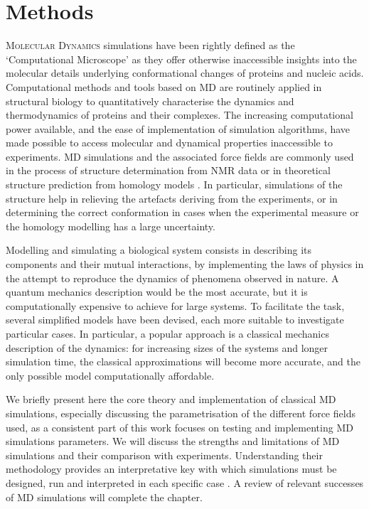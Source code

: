 \chapter{Methods} \label{chapter:MD}

\lettrine{M}{olecular Dynamics} simulations have been rightly defined as the `Computational Microscope' \citep{Lee2009,Dror2012} as they offer otherwise inaccessible insights into the molecular details underlying conformational changes of proteins and nucleic acids. Computational methods and tools based on MD are routinely applied in structural biology to quantitatively characterise the dynamics and thermodynamics of proteins and their complexes. The increasing computational power available, and the ease of implementation of simulation algorithms, have made possible to access molecular and dynamical properties inaccessible to experiments. MD simulations and the associated force fields are commonly used in the process of structure determination from NMR data or in theoretical structure prediction from homology models \citep{Vogel2017,Heo2018}. In particular, simulations of the structure help in relieving the artefacts deriving from the experiments, or in determining the correct conformation in cases when the experimental measure or the homology modelling has a large uncertainty.

Modelling and simulating a biological system consists in describing its components and their mutual interactions, by implementing the laws of physics in the attempt to reproduce the dynamics of phenomena observed in nature. A quantum mechanics description would be the most accurate, but it is computationally expensive to achieve for large systems. To facilitate the task, several simplified models have been devised, each more suitable to investigate particular cases.
%
In particular, a popular approach is a classical mechanics description of the dynamics: for increasing sizes of the systems and longer simulation time, the classical approximations will become more accurate, and the only possible model computationally affordable.

We briefly present here the core theory and implementation of classical MD simulations, especially discussing the parametrisation of the different force fields used, as a consistent part of this work focuses on testing and implementing MD simulations parameters. We will discuss the strengths and limitations of MD simulations and their comparison with experiments. Understanding their methodology provides an interpretative key with which simulations must be designed, run and interpreted in each specific case \citep{vanGunsteren2006}. A review of relevant successes of MD simulations will complete the chapter.


